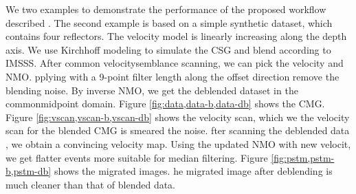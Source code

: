 We  two examples to demonstrate the performance of the proposed workflow described . 
The second example is based on a simple synthetic dataset, which contains four reflectors. The velocity  model is linearly increasing along the depth axis. We use Kirchhoff modeling to simulate the CSG and blend  according to IMSSS. After  common velocity\new{-}semblance scanning, we can pick the  velocity and  NMO. pplying   with a 9-point filter length along the offset direction remove the blending noise. By inverse NMO, we get the deblended dataset in the common\new{-}midpoint domain.  Figure \ref{fig:data,data-b,data-db} shows the  CMG. Figure \ref{fig:vscan,vscan-b,vscan-db} shows the  velocity scan,  which we  the velocity scan for the blended CMG is  smeared  the noise. fter scanning the  deblended data , we  obtain a convincing velocity map. Using the updated NMO with new velocit, we  get flatter events  more suitable for median filtering.  Figure \ref{fig:pstm,pstm-b,pstm-db} shows the  migrated images.  he migrated image after deblending is much cleaner than that of  blended data. 




